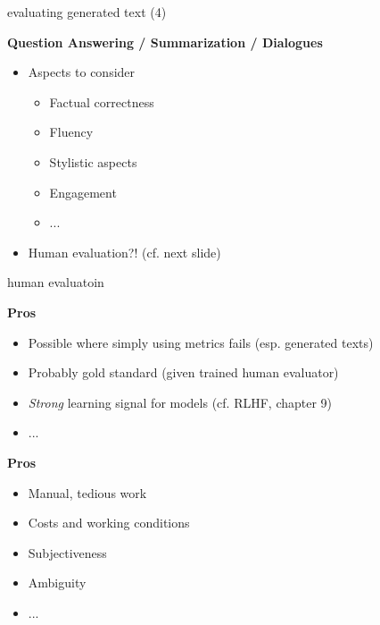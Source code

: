 
\begin{vbframe}{evaluating generated text (4)}

\vfill

\textbf{Question Answering / Summarization / Dialogues}

\begin{itemize}
	\item Aspects to consider
			\begin{itemize}
				\item Factual correctness
				\item Fluency
				\item Stylistic aspects
				\item Engagement
				\item ...
			\end{itemize}
	\item Human evaluation?! (cf. next slide)
\end{itemize}

\vfill

\end{vbframe}


\begin{vbframe}{human evaluatoin}

\vfill

\textbf{Pros}

\begin{itemize}
	\item Possible where simply using metrics fails (esp. generated texts)
	\item Probably gold standard (given trained human evaluator)
	\item \textit{Strong} learning signal for models (cf. RLHF, chapter 9)
	\item ...
\end{itemize}

\vspace{.3cm}

\textbf{Pros}

\begin{itemize}
	\item Manual, tedious work
  \item Costs and working conditions
	\item Subjectiveness
	\item Ambiguity
	\item ...
\end{itemize}

\vfill

\end{vbframe}


\endlecture
